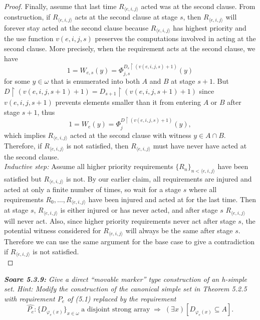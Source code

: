 \documentclass{article}
\begin{document}
\begin{proof}
    Finally, assume that last time $R_{\langle e,i,j\rangle}$ acted was at
    the second clause. From construction, if $R_{\langle e,i,j\rangle}$
    acts at the second clause at stage $s$, then $R_{\langle e,i,j\rangle}$
    will forever stay acted at the second clause because $R_{\langle
    e,i,j\rangle}$ has highest priority and the use function $v(e,i,j,s)$
    preserves the computations involved in acting at the second clause.
    More precisely, when the requirement acts at the second clause, we
    have
    \[1=W_{e,s}(y) =\Phi_{j,s}^{D_s\restriction (v(e,i,j,s)+1)}(y)\]
    for some $y\in\omega$ that is enumerated into both $A$ and $B$ at stage
    $s+1$. But $D\restriction (v(e,i,j,s+1)+1) =D_{s+1}\restriction
    (v(e,i,j,s+1)+1)$ since $v(e,i,j,s+1)$ prevents elements smaller than
    it from entering $A$ or $B$ after stage $s+1$, thus
    \[1=W_{e}(y) =\Phi_{j}^{D\restriction (v(e,i,j,s)+1)}(y),\] which
    implies $R_{\langle e,i,j\rangle}$ acted at the second clause
    with witness $y\in A\cap B$. Therefore, if $R_{\langle e,i,j\rangle}$
    is not satisfied, then $R_{\langle e,i,j\rangle}$ must have never
    have acted at the second clause. \\

    \textit{Inductive step:} Assume all higher priority requirements
    $\{R_n\}_{n <\langle e,i,j\rangle}$ have been satisfied but $R_{\langle
    e,i,j\rangle}$ is not. By our earlier claim, all requirements are
    injured and acted at only a finite number of times, so wait for a stage
    $s$ where all requirements $R_0,\ldots,R_{\langle e,i,j\rangle}$ have
    been injured and acted at for the last time. Then at stage $s$,
    $R_{\langle e,i,j\rangle}$ is either injured or has never acted, and
    after stage $s$ $R_{\langle e,i,j\rangle}$ will never act. Also, since
    higher priority requirements never act after stage $s$, the potential
    witness considered for $R_{\langle e,i,j\rangle}$ will always be the
    same after stage $s$. Therefore we can use the same argument for the
    base case to give a contradiction if $R_{\langle e,i,j\rangle}$ is not
    satisfied. \\
  \end{proof}

\it \textbf{Soare 5.3.9:} Give a direct ``movable marker'' type
  construction of an h-simple set. Hint: Modify the construction of the
  canonical simple set in Theorem 5.2.5 with requirement $P_e$ of (5.1)
  replaced by the requirement
  \[\hat{P_e}: \{D_{\varphi_e(x)}\}_{x\in\omega}\; \text{a disjoint strong
  array}\; \Rightarrow\; (\exists x)[D_{\varphi_e(x)} \subseteq A].\]
\end{document}
